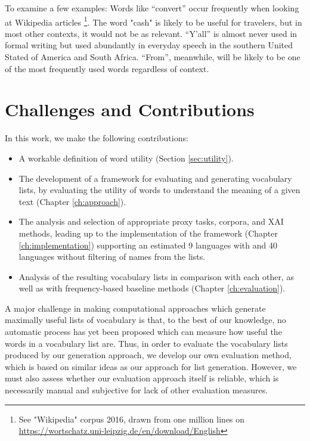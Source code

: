 To examine a few examples: Words like “convert” occur frequently when looking at Wikipedia articles \footnote{See "Wikipedia" corpus 2016, drawn from one million lines on \url{https://wortschatz.uni-leipzig.de/en/download/English}}. The word "cash" is likely to be useful for travelers, but in most other contexts, it would not be as relevant. “Y’all” is almost never used in formal writing but used abundantly in everyday speech in the southern United Stated of America and South Africa. “From”, meanwhile, will be likely to be one of the most frequently used words regardless of context.

\section{Challenges and Contributions} \label{sec:challenges-and-contributions}
In this work, we make the following contributions:

\begin{itemize}
	\item A workable definition of word utility (Section \ref{sec:utility}).
	\item The development of a framework for evaluating and generating vocabulary lists, by evaluating the utility of words to understand the meaning of a given text (Chapter \ref{ch:approach}).
	\item The analysis and selection of appropriate proxy tasks, corpora, and XAI methods, leading up to the implementation of the framework (Chapter \ref{ch:implementation}) supporting an estimated 9 languages with and 40 languages without filtering of names from the lists.
	\item Analysis of the resulting vocabulary lists in comparison with each other, as well as with frequency-based baseline methods (Chapter \ref{ch:evaluation}).
\end{itemize}

A major challenge in making computational approaches which generate maximally useful lists of vocabulary is that, to the best of our knowledge, no automatic process has yet been proposed which can measure how useful the words in a vocabulary list are. 
Thus, in order to evaluate the vocabulary lists produced by our generation approach, we develop our own evaluation method, which is based on similar ideas as our approach for list generation.
However, we must also assess whether our evaluation approach itself is reliable, which is necessarily manual and subjective for lack of other evaluation measures.

